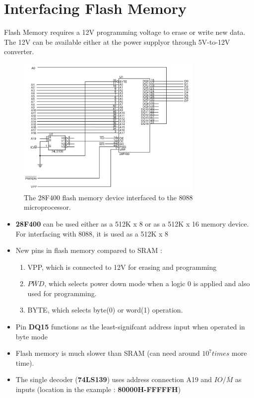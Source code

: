 \section{Interfacing Flash Memory}
Flash Memory requires a 12V programming voltage to erase or write new data. The 12V can be available either at the power supplyor through 5V-to-12V converter.
\begin{figure}[h!]
  \includegraphics[width = 0.8\textwidth]{./figures/Flash_mem.png}
  \caption{The 28F400 flash memory device interfaced to the 8088 microprocessor.}
  \label{}
\end{figure}
\begin{itemize}
  \item \textbf{28F400} can be used either as a 512K x 8 or as a 512K x 16 memory device. For interfacing with 8088, it is used as a 512K x 8
  \item New pins in flash memory compared to SRAM :
  \begin{enumerate}
    \item VPP, which is connected to 12V for erasing and programming
    \item $\overline{PWD}$, which selects power down mode when a logic 0 is applied and also used for programming.
    \item BYTE, which selects byte(0) or word(1) operation.
  \end{enumerate}

  \item Pin \textbf{DQ15} functions as the least-signifcant address input when operated in byte mode
  \item Flash memory is much slower than SRAM (can need around $10^7 times$ more time).
  \item The single decoder (\textbf{74LS139}) uses address connection A19 and $IO/\overline{M}$ as inputs (location in the example : \textbf{80000H-FFFFFH})
\end{itemize}


